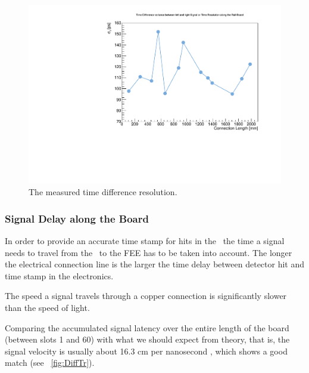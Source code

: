 \documentclass[../BTOF_summary.tex]{subfiles}
\begin{document}
\begin{figure}[htbp]
    \centering
    \includegraphics[scale=0.5]{Pictures/TimeRes.pdf}
    \caption{The measured time difference resolution.}
    \label{fig:TR}
\end{figure}

\subsubsection{Signal Delay along the Board}

In order to provide an accurate time stamp for hits in the \btofD\ the time a signal needs to travel from the \sipms\ to the FEE has to be taken into account. The longer the electrical connection line is the larger the time delay between detector hit and time stamp in the electronics.

The speed a signal travels through a copper connection is significantly slower than the speed of light.

Comparing the accumulated signal latency over the entire length of the board (between slots 1 and 60) with what we should expect from theory, that is, the signal velocity is usually about 16.3 cm per nanosecond \cite{bril,paul}, which shows a good match (see \fig~\ref{fig:DiffTr}).
\end{document}
